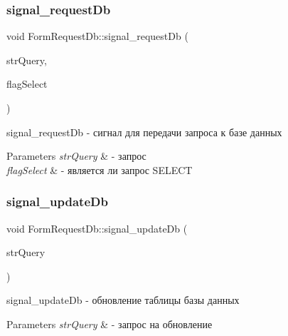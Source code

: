 \subsubsection{\texorpdfstring{signal\+\_\+request\+Db}{signal\_requestDb}}
{\footnotesize\ttfamily void Form\+Request\+Db\+::signal\+\_\+request\+Db (\begin{DoxyParamCaption}\item[{const Q\+String \&}]{str\+Query,  }\item[{bool}]{flag\+Select }\end{DoxyParamCaption})\hspace{0.3cm}{\ttfamily [signal]}}



signal\+\_\+request\+Db -\/ сигнал для передачи запроса к базе данных 


\begin{DoxyParams}{Parameters}
{\em str\+Query} & -\/ запрос \\
\hline
{\em flag\+Select} & -\/ является ли запрос S\+E\+L\+E\+CT \\
\hline
\end{DoxyParams}
\mbox{\label{classFormRequestDb_a975c3238a2e70f63172b2e7dd2a3d17d}} 
\subsubsection{\texorpdfstring{signal\+\_\+update\+Db}{signal\_updateDb}}
{\footnotesize\ttfamily void Form\+Request\+Db\+::signal\+\_\+update\+Db (\begin{DoxyParamCaption}\item[{const Q\+String \&}]{str\+Query }\end{DoxyParamCaption})\hspace{0.3cm}{\ttfamily [signal]}}



signal\+\_\+update\+Db -\/ обновление таблицы базы данных 


\begin{DoxyParams}{Parameters}
{\em str\+Query} & -\/ запрос на обновление \\
\hline
\end{DoxyParams}
\mbox{\label{classFormRequestDb_a3e6c1c86440f834a79f43e82a1568207}} 
